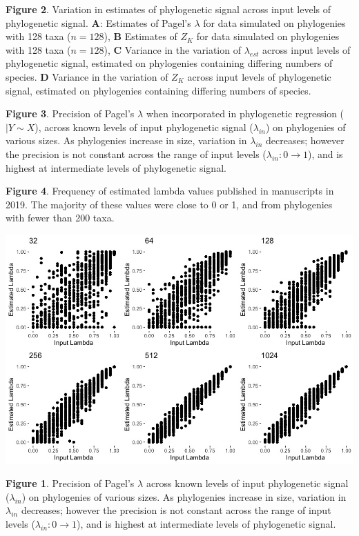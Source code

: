 \documentclass[
]{article}
\begin{document}
\textbf{Figure 2}. Variation in estimates of phylogenetic signal across
input levels of phylogenetic signal. \textbf{A}: Estimates of Pagel's
\(\lambda\) for data simulated on phylogenies with 128 taxa (\(n=128\)),
\textbf{B} Estimates of \(Z_K\) for data simulated on phylogenies with
128 taxa (\(n=128\)), \textbf{C} Variance in the variation of
\(\lambda_{est}\) across input levels of phylogenetic signal, estimated
on phylogenies containing differing numbers of species. \textbf{D}
Variance in the variation of \(Z_K\) across input levels of phylogenetic
signal, estimated on phylogenies containing differing numbers of
species. \hfill\break

\textbf{Figure 3}. Precision of Pagel's \(\lambda\) when incorporated in
phylogenetic regression (\(|Y\sim X\)), across known levels of input
phylogenetic signal (\(\lambda_{in}\)) on phylogenies of various sizes.
As phylogenies increase in size, variation in \(\lambda_{in}\)
decreases; however the precision is not constant across the range of
input levels (\(\lambda_{in}: 0 \to 1\)), and is highest at intermediate
levels of phylogenetic signal. \hfill\break

\textbf{Figure 4}. Frequency of estimated lambda values published in
manuscripts in 2019. The majority of these values were close to 0 or 1,
and from phylogenies with fewer than 200 taxa.

\newpage

\includegraphics[width=0.95\linewidth]{Fig1}

\singlespacing \textbf{Figure 1}. Precision of Pagel's \(\lambda\)
across known levels of input phylogenetic signal (\(\lambda_{in}\)) on
phylogenies of various sizes. As phylogenies increase in size, variation
in \(\lambda_{in}\) decreases; however the precision is not constant
across the range of input levels (\(\lambda_{in}: 0 \to 1\)), and is
highest at intermediate levels of phylogenetic signal.
\end{document}

